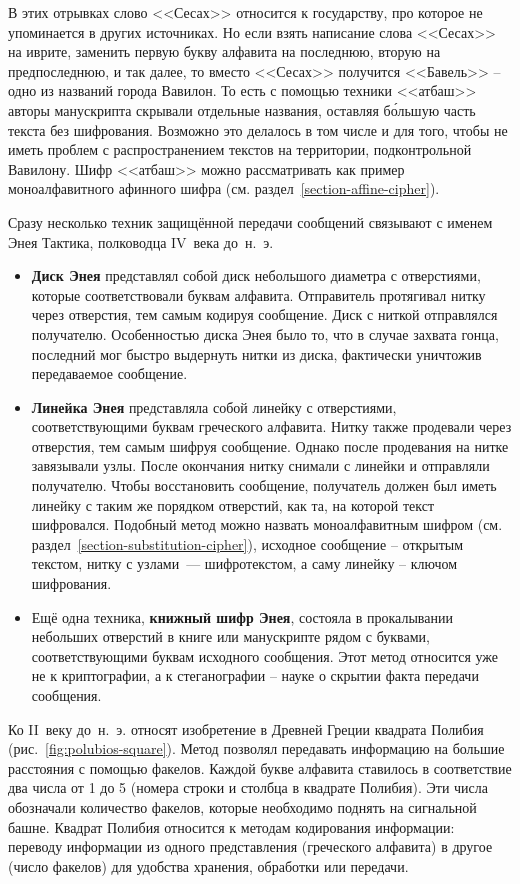 В этих отрывках слово <<Сесах>> относится к государству, про которое не упоминается в других источниках. Но если взять написание слова <<Сесах>> на иврите, заменить первую букву алфавита на последнюю, вторую на предпоследнюю, и так далее, то вместо <<Сесах>> получится <<Бавель>> -- одно из названий города Вавилон. То есть с помощью техники <<атбаш>> авторы манускрипта скрывали отдельные названия, оставляя б\'{о}льшую часть текста без шифрования. Возможно это делалось в том числе и для того, чтобы не иметь проблем с распространением текстов на территории, подконтрольной Вавилону. Шифр <<атбаш>> можно рассматривать как пример моноалфавитного афинного шифра (см. раздел~\ref{section-affine-cipher}).

Сразу несколько техник защищённой передачи сообщений связывают с именем Энея Тактика, полководца IV~века до~н.~э.
\begin{itemize}
	\item \textbf{Диск Энея} представлял собой диск небольшого диаметра с отверстиями, которые соответствовали буквам алфавита. Отправитель протягивал нитку через отверстия, тем самым кодируя сообщение. Диск с ниткой отправлялся получателю. Особенностью диска Энея было то, что в случае захвата гонца, последний мог быстро выдернуть нитки из диска, фактически уничтожив передаваемое сообщение.
	\item \textbf{Линейка Энея} представляла собой линейку с отверстиями, соответствующими буквам греческого алфавита. Нитку также продевали через отверстия, тем самым шифруя сообщение. Однако после продевания на нитке завязывали узлы. После окончания нитку снимали с линейки и отправляли получателю. Чтобы восстановить сообщение, получатель должен был иметь линейку с таким же порядком отверстий, как та, на которой текст шифровался. Подобный метод можно назвать моноалфавитным шифром (см. раздел~\ref{section-substitution-cipher}), исходное сообщение -- открытым текстом, нитку с узлами~--- шифротекстом, а саму линейку -- ключом шифрования.
	\item Ещё одна техника, \textbf{книжный шифр Энея}, состояла в прокалывании небольших отверстий в книге или манускрипте рядом с буквами, соответствующими буквам исходного сообщения. Этот метод относится уже не к криптографии, а к стеганографии -- науке о скрытии факта передачи сообщения.
\end{itemize}

Ко II~веку до~н.~э. относят изобретение в Древней Греции квадрата Полибия (рис.~\ref{fig:polubios-square}). Метод позволял передавать информацию на большие расстояния с помощью факелов. Каждой букве алфавита ставилось в соответствие два числа от 1 до 5 (номера строки и столбца в квадрате Полибия). Эти числа обозначали количество факелов, которые необходимо поднять на сигнальной башне. Квадрат Полибия относится к методам кодирования информации: переводу информации из одного представления (греческого алфавита) в другое (число факелов) для удобства хранения, обработки или передачи.

